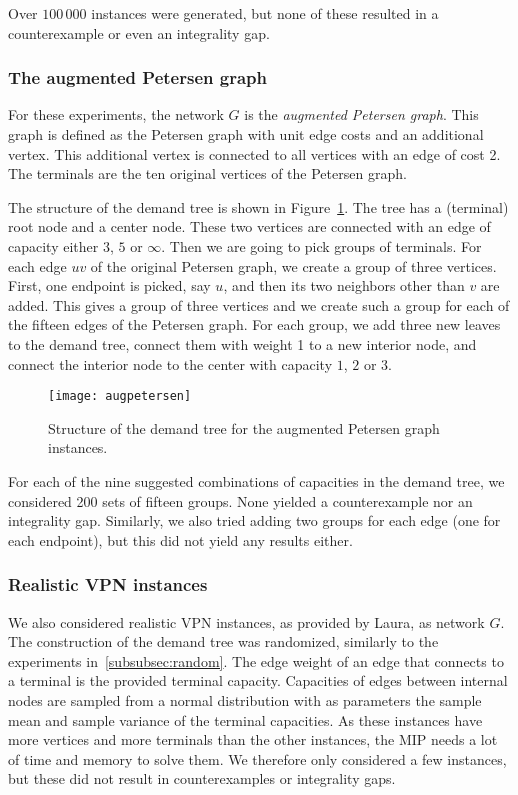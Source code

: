 Over $100\,000$ instances were generated, but none of these resulted in a counterexample or even an integrality gap.

\subsubsection{The augmented Petersen graph}
For these experiments, the network $G$ is the \emph{augmented Petersen graph}.
This graph is defined as the Petersen graph with unit edge costs and an additional vertex.
This additional vertex is connected to all vertices with an edge of cost 2.
The terminals are the ten original vertices of the Petersen graph.

The structure of the demand tree is shown in Figure~\ref{fig:augpetersen}.
The tree has a (terminal) root node and a center node.
These two vertices are connected with an edge of capacity either $3$, $5$ or $\infty$.
Then we are going to pick groups of terminals.
For each edge $uv$ of the original Petersen graph, we create a group of three vertices.
First, one endpoint is picked, say $u$, and then its two neighbors other than $v$ are added.
This gives a group of three vertices and we create such a group for each of the fifteen edges of the Petersen graph.
For each group, we add three new leaves to the demand tree, connect them with weight 1 to a new interior node, and connect the interior node to the center with capacity $1$, $2$ or $3$.

\begin{figure}
    \centering
    \texttt{[image: augpetersen]}
    \caption{Structure of the demand tree for the augmented Petersen graph instances.}
    \label{fig:augpetersen}
\end{figure}

For each of the nine suggested combinations of capacities in the demand tree, we considered 200 sets of fifteen groups.
None yielded a counterexample nor an integrality gap.
Similarly, we also tried adding two groups for each edge (one for each endpoint), but this did not yield any results either.

\subsubsection{Realistic VPN instances}
We also considered realistic VPN instances, as provided by Laura, as network $G$.
The construction of the demand tree was randomized, similarly to the experiments in~\ref{subsubsec:random}.
The edge weight of an edge that connects to a terminal is the provided terminal capacity.
Capacities of edges between internal nodes are sampled from a normal distribution with as parameters the sample mean and sample variance of the terminal capacities.
As these instances have more vertices and more terminals than the other instances, the MIP needs a lot of time and memory to solve them.
We therefore only considered a few instances, but these did not result in counterexamples or integrality gaps.

